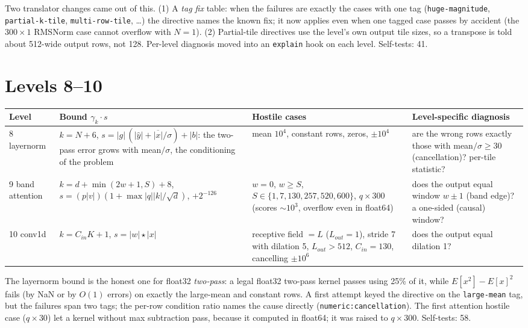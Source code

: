 \documentclass[11pt]{article}
\newcommand{\code}[1]{\texttt{#1}}
\begin{document}
\medskip
Two translator changes came out of this. (1) A \emph{tag fix} table: when the failures are exactly
the cases with one tag (\code{huge-magnitude}, \code{partial-k-tile}, \code{multi-row-tile}, \dots)
the directive names the known fix; it now applies even when one tagged case passes by accident
(the $300\times1$ RMSNorm case cannot overflow with $N=1$). (2) Partial-tile directives use the
level's own output tile sizes, so a transpose is told about 512-wide output rows, not 128.
Per-level diagnosis moved into an \code{explain} hook on each level. Self-tests: 41.

\section{Levels 8--10}
\label{sec:l810}

\noindent\begin{tabularx}{\linewidth}{@{}l>{\raggedright\arraybackslash}p{4.2cm}>{\raggedright\arraybackslash}p{3.4cm}Y@{}}
\toprule
Level & Bound $\gamma_k\cdot s$ & Hostile cases & Level-specific diagnosis \\
 layernorm & $k=N+6$, $s=|g|\,(|\hat y| + \overline{|x|}/\sigma) + |b|$: the two-pass error grows with
  mean$/\sigma$, the conditioning of the problem & mean $10^4$, constant rows, zeros, $\pm10^4$ &
  are the wrong rows exactly those with mean$/\sigma \ge 30$ (cancellation)? per-tile statistic? \\
9 band attention & $k=d+\min(2w+1,S)+8$, $s=(p|v|)(1+\max|q||k|/\sqrt d)$, $+2^{-126}$ &
  $w=0$, $w\ge S$, $S\in\{1,7,130,257,520,600\}$, $q\times300$ (scores $\sim10^3$, overflow even in
  float64) & does the output equal window $w\pm1$ (band edge)? a one-sided (causal) window? \\
10 conv1d & $k=C_{in}K+1$, $s=|w|\star|x|$ & receptive field $=L$ ($L_{out}=1$), stride 7 with
  dilation 5, $L_{out}>512$, $C_{in}=130$, cancelling $\pm10^6$ & does the output equal dilation 1? \\
\bottomrule
\end{tabularx}

\medskip
The layernorm bound is the honest one for float32 \emph{two-pass}: a legal float32 two-pass kernel
passes using 25\% of it, while $E[x^2]-E[x]^2$ fails (by NaN or by $O(1)$ errors) on exactly the
large-mean and constant rows. A first attempt keyed the directive on the \code{large-mean} tag, but
the failures span two tags; the per-row condition ratio names the cause directly
(\code{numeric:cancellation}). The first attention hostile case ($q\times30$) let a kernel without max
subtraction pass, because it computed in float64; it was raised to $q\times300$. Self-tests: 58.
\end{document}
